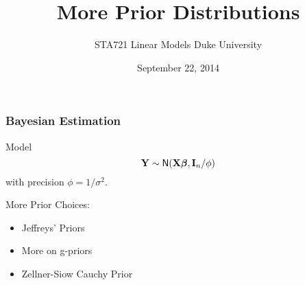 \documentclass[handout]{beamer}
\title{More Prior Distributions}
\institute{Merlise Clyde}
\author{STA721 Linear Models Duke University}
\date{September 22, 2014}
\begin{document}
\maketitle

\begin{frame}
  \frametitle{Bayesian Estimation}
  Model
$$
\mathbf{Y} \sim \textsf{N}(\mathbf{X} \boldsymbol{\beta}, \mathbf{I}_n/\phi)
$$
with precision $\phi = 1/\sigma^2$.   
\pause

\vfill
More Prior Choices:
\begin{itemize}
\item Jeffreys' Priors
\item More on g-priors
\item Zellner-Siow Cauchy Prior
\end{itemize}
\end{frame}
\end{document}
